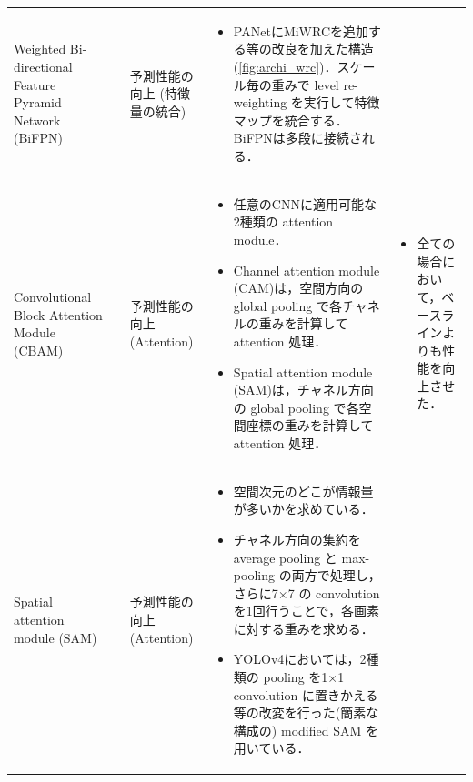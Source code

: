 \documentclass[originalpaper,fleqn]{jsaiart}     %
\begin{document}
\begin{table}
\begin{center}
\begin{tabularx}{\linewidth}{Xp{1.5cm}Xp{7cm}X}
            Weighted Bi-directional Feature Pyramid Network (BiFPN)
            \vspace{0.7\baselineskip}
            & \cite{TPL20} & 予測性能の向上 (特徴量の統合) & 
            \begin{itemize}
                \vspace{-0.7\baselineskip}
                \setlength{\leftskip}{-3mm}
                \item PANetにMiWRCを追加する等の改良を加えた構造(\ref{fig:archi_wrc})．スケール毎の重みで level re-weighting を実行して特徴マップを統合する．BiFPNは多段に接続される．
            \end{itemize}
            &
            \\

            Convolutional Block Attention Module (CBAM) 
            & \cite{WPLK18} & 予測性能の向上 (Attention) & 
            \begin{itemize}
                \vspace{-0.7\baselineskip}
                \setlength{\leftskip}{-3mm}
                \item 任意のCNNに適用可能な2種類の attention module．
                \item Channel attention module (CAM)は，空間方向の global pooling で各チャネルの重みを計算して attention 処理．
                \item Spatial attention module (SAM)は，チャネル方向の global pooling で各空間座標の重みを計算して attention 処理． 
            \end{itemize}
            &
            \begin{itemize}
                \vspace{-0.7\baselineskip}
                \setlength{\leftskip}{-3mm}
                \item 全ての場合において，ベースラインよりも性能を向上させた．
            \end{itemize}
            \\

            Spatial attention module (SAM)
            & \cite{WPLK18} & 予測性能の向上 (Attention) & 
            \begin{itemize}
                \vspace{-0.7\baselineskip}
                \setlength{\leftskip}{-3mm}
                \item 空間次元のどこが情報量が多いかを求めている．
                \item チャネル方向の集約を average pooling と max-pooling の両方で処理し，さらに7$\times$7 の convolutionを1回行うことで，各画素に対する重みを求める．
                \item YOLOv4においては，2種類の pooling を1$\times$1 convolution に置きかえる等の改変を行った(簡素な構成の) modified SAM を用いている．
            \end{itemize}
            &
            \\


\end{tabularx}
\end{center}
\end{table}
\end{document}
